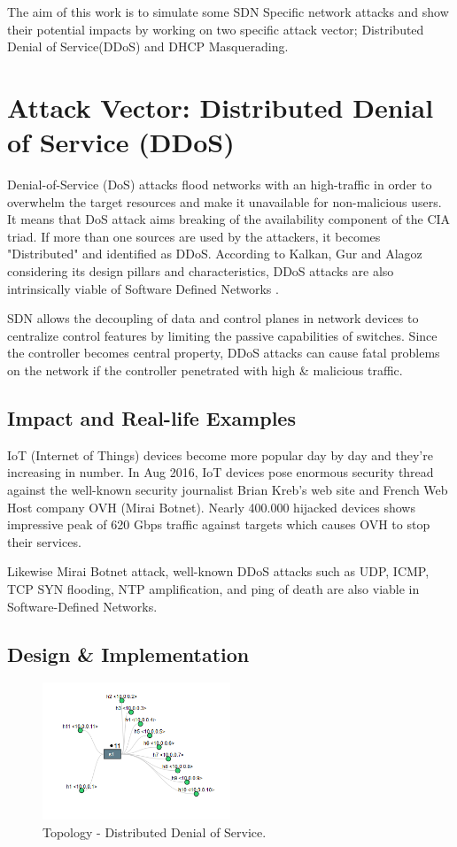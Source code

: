 \documentclass[conference,compsoc]{IEEEtran}
\begin{document}
The aim of this work is to simulate some SDN Specific network attacks and show their potential impacts by working on two specific attack vector; Distributed Denial of Service(DDoS) and DHCP Masquerading.


\section{Attack Vector: Distributed Denial of Service (DDoS)}

Denial-of-Service (DoS) attacks flood networks with an high-traffic in order to overwhelm the target resources and make it unavailable for non-malicious users. It means that DoS attack aims breaking of the availability component of the CIA triad. If more than one sources are used by the attackers, it becomes "Distributed" and identified as DDoS. According to Kalkan, Gur and Alagoz considering its design pillars and characteristics, DDoS attacks are also intrinsically viable of Software Defined Networks \cite{8030502}. 

SDN allows the decoupling of data and control planes in network devices to centralize control features by limiting the passive capabilities of switches. Since the controller becomes central property, DDoS attacks can cause fatal problems on the network if the controller penetrated with high \& malicious traffic.

\subsection{Impact and Real-life Examples}
IoT (Internet of Things) devices become more popular day by day and they're increasing in number. In Aug 2016, IoT devices pose enormous security thread against the well-known security journalist Brian Kreb's web site and French Web Host company OVH (Mirai Botnet). Nearly 400.000 hijacked devices shows impressive peak of 620 Gbps traffic against targets which causes OVH to stop their services. \cite{MiraiBotnet}

Likewise Mirai Botnet attack, well-known DDoS attacks such as UDP, ICMP, TCP SYN flooding, NTP amplification, and ping of death are also viable in Software-Defined Networks.\\ 
\subsection{Design \& Implementation}

\begin{figure}[H]
\centering
\includegraphics[width=0.5\textwidth]{ddos_schema.png}
\caption{\label{fig:diagram_1}Topology - Distributed Denial of Service.}
\end{figure}
\end{document}
